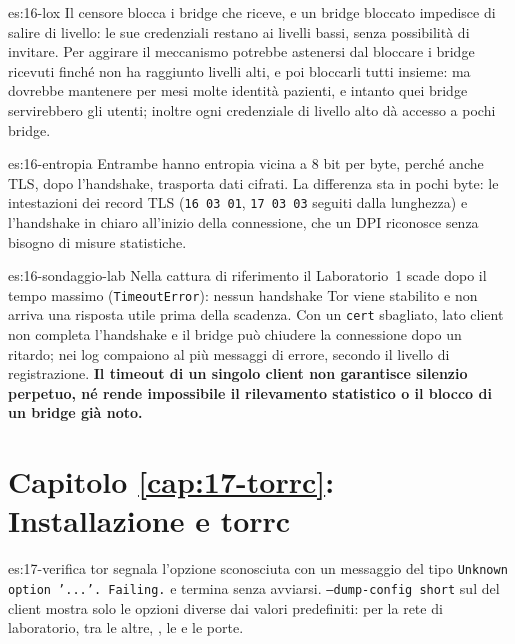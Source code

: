 \begin{soluzione}{es:16-lox}
Il censore blocca i bridge che riceve, e un bridge bloccato impedisce di salire di livello: le sue credenziali restano ai livelli bassi, senza possibilità di invitare. Per aggirare il meccanismo potrebbe astenersi dal bloccare i bridge ricevuti finché non ha raggiunto livelli alti, e poi bloccarli tutti insieme: ma dovrebbe mantenere per mesi molte identità pazienti, e intanto quei bridge servirebbero gli utenti; inoltre ogni credenziale di livello alto dà accesso a pochi bridge.
\end{soluzione}

\begin{soluzione}{es:16-entropia}
Entrambe hanno entropia vicina a 8 bit per byte, perché anche TLS, dopo l'handshake, trasporta dati cifrati. La differenza sta in pochi byte: le intestazioni dei record TLS (\texttt{16 03 01}, \texttt{17 03 03} seguiti dalla lunghezza) e l'handshake in chiaro all'inizio della connessione, che un DPI riconosce senza bisogno di misure statistiche.
\end{soluzione}

\begin{soluzione}{es:16-sondaggio-lab}
Nella cattura di riferimento il Laboratorio~1 scade dopo il tempo massimo (\texttt{TimeoutError}): nessun handshake Tor viene stabilito e non arriva una risposta utile prima della scadenza. Con un \texttt{cert} sbagliato,  lato client non completa l'handshake e il bridge può chiudere la connessione dopo un ritardo; nei log compaiono al più messaggi di errore, secondo il livello di registrazione. \textbf{Il timeout di un singolo client non garantisce silenzio perpetuo, né rende impossibile il rilevamento statistico o il blocco di un bridge già noto.}
\end{soluzione}

\section*{Capitolo \ref{cap:17-torrc}: Installazione e torrc}

\begin{soluzione}{es:17-verifica}
tor segnala l'opzione sconosciuta con un messaggio del tipo \texttt{Unknown option '...'. Failing.} e termina senza avviarsi. \texttt{--dump-config short} sul  del client mostra solo le opzioni diverse dai valori predefiniti: per la rete di laboratorio, tra le altre, , le  e le porte.
\end{soluzione}

